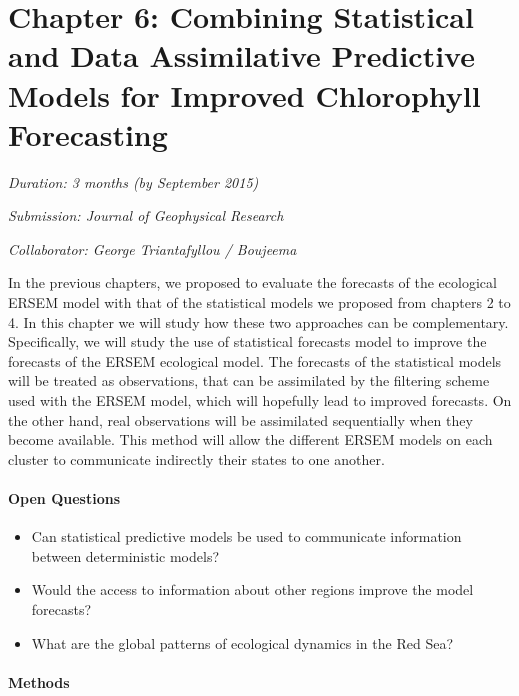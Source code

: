 \section{Chapter 6: Combining Statistical and Data Assimilative Predictive
Models for Improved Chlorophyll Forecasting}

\noindent \emph{Duration: 3 months (by September 2015)}

\noindent \emph{Submission: Journal of Geophysical Research}

\noindent \emph{Collaborator: George Triantafyllou / Boujeema}

\vspace{5mm}

In the previous chapters, we proposed to evaluate the forecasts of the
ecological ERSEM model with that of the statistical models we proposed from
chapters 2 to 4. In this chapter we will study how these two approaches can be
complementary. Specifically, we will study the use of statistical forecasts
model to improve the forecasts of the ERSEM ecological model. The forecasts of
the statistical models will be treated as observations, that can be assimilated
by the filtering scheme used with the ERSEM model, which will hopefully lead to
improved forecasts. On the other hand, real observations will be assimilated
sequentially when they become available. This method will allow the different
ERSEM models on each cluster to communicate indirectly their states to one
another. 

\paragraph{Open Questions}

\begin{itemize}

\item Can statistical predictive models be used to communicate information
between deterministic models?

\item Would the access to information about other regions improve the model
forecasts?

\item What are the global patterns of ecological dynamics in the Red Sea?

\end{itemize}

\paragraph{Methods}

